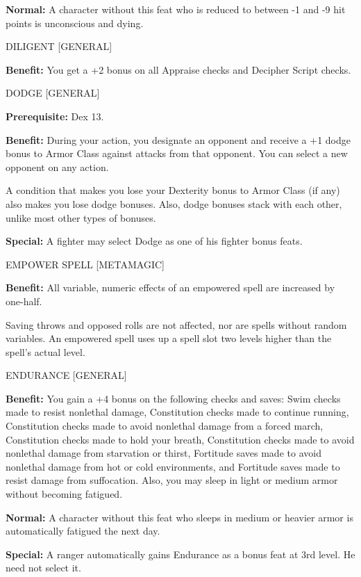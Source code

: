 \documentclass{article}
\begin{document}
\textbf{Normal:} A character without this feat who is reduced to between -1 and 
-9 hit points is unconscious and dying.

\vspace{12pt}
DILIGENT [GENERAL]

\textbf{Benefit:} You get a +2 bonus on all Appraise checks and Decipher Script 
checks.

\vspace{12pt}
DODGE [GENERAL]

\textbf{Prerequisite:} Dex 13.

\textbf{Benefit:} During your action, you designate an opponent and receive a +1 
dodge bonus to Armor Class against attacks from that opponent. You can select a 
new opponent on any action.

A condition that makes you lose your Dexterity bonus to Armor Class (if any) also 
makes you lose dodge bonuses. Also, dodge bonuses stack with each other, unlike 
most other types of bonuses.

\textbf{Special:} A fighter may select Dodge as one of his fighter bonus feats.

\vspace{12pt}
EMPOWER SPELL [METAMAGIC]

\textbf{Benefit:} All variable, numeric effects of an empowered spell are increased 
by one-half.

Saving throws and opposed rolls are not affected, nor are spells without random 
variables. An empowered spell uses up a spell slot two levels higher than the spell's 
actual level.

\vspace{12pt}
ENDURANCE [GENERAL]

\textbf{Benefit:} You gain a +4 bonus on the following checks and saves: Swim checks 
made to resist nonlethal damage, Constitution checks made to continue running, 
Constitution checks made to avoid nonlethal damage from a forced march, Constitution 
checks made to hold your breath, Constitution checks made to avoid nonlethal damage 
from starvation or thirst, Fortitude saves made to avoid nonlethal damage from 
hot or cold environments, and Fortitude saves made to resist damage from suffocation. 
Also, you may sleep in light or medium armor without becoming fatigued.

\textbf{Normal:} A character without this feat who sleeps in medium or heavier 
armor is automatically fatigued the next day.

\textbf{Special:} A ranger automatically gains Endurance as a bonus feat at 3rd 
level. He need not select it.
\end{document}
